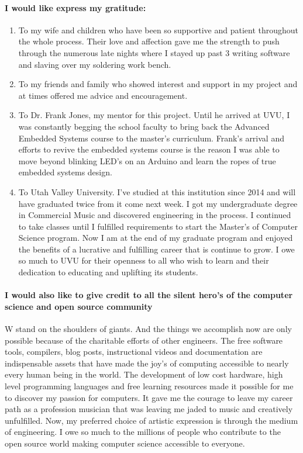 \documentclass[acmlarge,screen]{acmart}
\begin{document}
	\paragraph{I would like express my gratitude:}
	\begin{enumerate}
		\item To my wife and children who have been so supportive and patient throughout the whole process. Their love and affection gave me the strength to push through the numerous late nights where I stayed up past 3 writing software and slaving over my soldering work bench.
		\item To my friends and family who showed interest and support in my project and at times offered me advice and encouragement.
		\item To Dr. Frank Jones, my mentor for this project. Until he arrived at UVU, I was constantly begging the school faculty to bring back the Advanced Embedded Systems course to the master's curriculum. Frank's arrival and efforts to revive the embedded systems course is the reason I was able to move beyond blinking LED's on an Arduino and learn the ropes of true embedded systems design.
		\item To Utah Valley University. I've studied at this institution since 2014 and will have graduated twice from it come next week. I got my undergraduate degree in Commercial Music and discovered engineering in the process. I continued to take classes until I fulfilled requirements to start the Master's of Computer Science program. Now I am at the end of my graduate program and enjoyed the benefits of a lucrative and fulfilling career that is continue to grow. I owe so much to UVU for their openness to all who wish to learn and their dedication to educating and uplifting its students.
	\end{enumerate}

	\paragraph{I would also like to give credit to all the silent hero's of the computer science and open source community} W stand on the shoulders of giants. And the things we accomplish now are only possible because of the charitable efforts of other engineers. The free software tools, compilers, blog posts, instructional videos and documentation are indispensable assets that have made the joy's of computing accessible to nearly every human being in the world. The development of low cost hardware, high level programming languages and free learning resources made it possible for me to discover my passion for computers. It gave me the courage to leave my career path as a profession musician that was leaving me jaded to music and creatively unfulfilled. Now, my preferred choice of artistic expression is through the medium of engineering. I owe so much to the millions of people who contribute to the open source world making computer science accessible to everyone.
\end{document}
